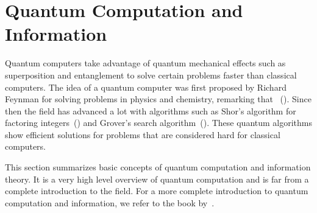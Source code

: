 \documentclass[a4paper,10pt]{article}
\begin{document}
\section{Quantum Computation and Information} \label{sec:quantum-computation-information}
Quantum computers take advantage of quantum mechanical effects such as superposition and entanglement to solve certain problems faster than classical computers.
The idea of a quantum computer was first proposed by Richard Feynman for solving problems in physics and chemistry, remarking that ~(\cite{feynman-simulating}).
Since then the field has advanced a lot with algorithms such as Shor's algorithm for factoring integers~(\cite{shor-factoring}) and Grover's search algorithm~(\cite{grover-search}).
These quantum algorithms show efficient solutions for problems that are considered hard for classical computers.

This section summarizes basic concepts of quantum computation and information theory.
It is a very high level overview of quantum computation and is far from a complete introduction to the field.
For a more complete introduction to quantum computation and information, we refer to the book by~\textcite{nielsen-chuang}.
\end{document}
